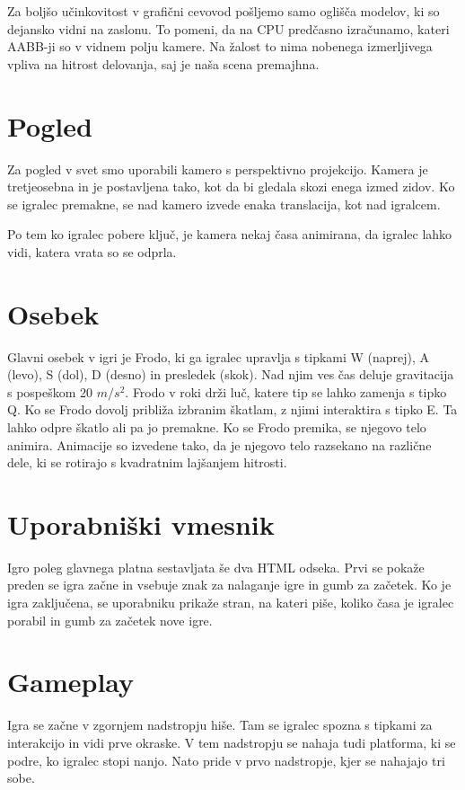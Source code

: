 \documentclass[a4paper,12pt]{article}
\begin{document}
Za boljšo učinkovitost v grafični cevovod pošljemo samo oglišča modelov, ki so dejansko vidni na zaslonu. To pomeni, da na CPU predčasno izračunamo, kateri AABB-ji so v vidnem polju kamere. Na žalost to nima nobenega izmerljivega vpliva na hitrost delovanja, saj je naša scena premajhna.

\section{Pogled}
Za pogled v svet smo uporabili kamero s perspektivno projekcijo. Kamera je tretjeosebna in je postavljena tako, kot da bi gledala skozi enega izmed zidov. Ko se igralec premakne, se nad kamero izvede enaka translacija, kot nad igralcem.

Po tem ko igralec pobere ključ, je kamera nekaj časa animirana, da igralec lahko vidi, katera vrata so se odprla.

\section{Osebek}
 Glavni osebek v igri je Frodo, ki ga igralec upravlja s tipkami W (naprej), A (levo), S (dol), D (desno) in presledek (skok). Nad njim ves čas deluje gravitacija s pospeškom 20 \(m/s^{2} \). Frodo v roki drži luč, katere tip se lahko zamenja s tipko Q. Ko se Frodo dovolj približa izbranim škatlam, z njimi interaktira s tipko E. Ta lahko odpre škatlo ali pa jo premakne.
Ko se Frodo premika, se njegovo telo animira. Animacije so izvedene tako, da je njegovo telo razsekano na različne dele, ki se rotirajo s kvadratnim lajšanjem hitrosti.

\section{Uporabniški vmesnik}
\noindent Igro poleg glavnega platna sestavljata še dva HTML odseka. Prvi se pokaže preden se igra začne in vsebuje znak za nalaganje igre in gumb za začetek. Ko je igra zaključena, se uporabniku prikaže stran, na kateri piše, koliko časa je igralec porabil in gumb za začetek nove igre.

\section{Gameplay}
Igra se začne v zgornjem nadstropju hiše. Tam se igralec spozna s tipkami za interakcijo in vidi prve okraske. V tem nadstropju se nahaja tudi platforma, ki se podre, ko igralec stopi nanjo. Nato pride v prvo nadstropje, kjer se nahajajo tri sobe.
\end{document}
